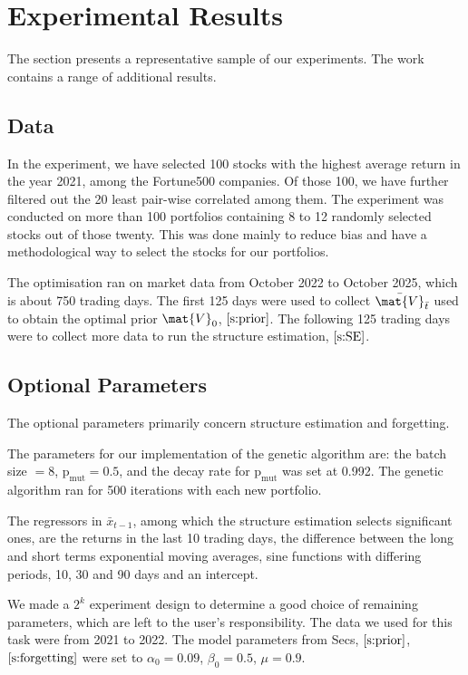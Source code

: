 \section{Experimental Results}
\label{s:experiments}
The section presents a representative sample of our experiments. The work \cite{Pro:26} contains a range of additional results.

\subsection{Data} \label{s:data}
In the experiment, we have selected 100 stocks with the highest average return in the year 2021, among the Fortune500 companies. Of those 100, we have further filtered out the 20 least pair-wise correlated among them. The experiment was conducted on more than 100 portfolios containing 8 to 12 randomly selected stocks out of those twenty. This was done mainly to reduce bias and have a methodological way to select the stocks for our portfolios.

The optimisation ran on market data from October 2022 to October 2025, which is about 750 trading days.  The first 125 days were used to collect $\bar{\mat{V}}_{\bar{t}}$ used to obtain the optimal prior $\mat{V}_0$, $\ref{s:prior}$. The following 125 trading days were to collect more data to run the structure estimation, $\ref{s:SE}$.

\subsection{Optional Parameters} \label{s:options}
The optional parameters primarily concern structure estimation and forgetting.

The parameters for our implementation of the genetic algorithm are: the batch size $=8$, $\text{p}_{\text{mut}} = 0.5$, and the decay rate for $\text{p}_{\text{mut}}$ was set at 0.992. The genetic algorithm ran for 500 iterations with each new portfolio.

The regressors in $\bar{x}_{t-1}$, among which the structure estimation selects significant ones, are the returns in the last 10 trading days, the difference between the long and short terms exponential moving averages, sine functions with differing periods, 10, 30 and 90 days and an intercept.

We made a $2^k$ experiment design \cite{4736103} to determine a good choice of remaining parameters, which are left to the user's responsibility. The data we used for this task were from 2021 to 2022. The model parameters from Secs, $\ref{s:prior}$, $\ref{s:forgetting}$ were set to $\alpha_0 = 0.09$, $\beta_0 = 0.5$, $\mu = 0.9$.

